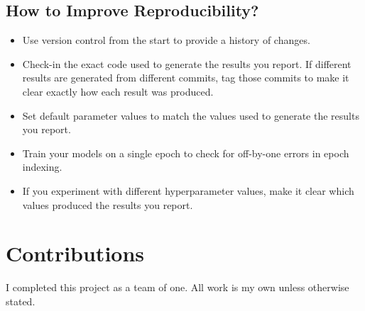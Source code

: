 \documentclass[letterpaper]{article} %
\begin{document}
\subsection{How to Improve Reproducibility?}
\label{sec:improvements}

\begin{itemize}
    \item Use version control from the start to provide a history of changes.
    \item Check-in the exact code used to generate the results you report. If different results are generated from different commits, tag those commits to make it clear exactly how each result was produced.
    \item Set default parameter values to match the values used to generate the results you report.
    \item Train your models on a single epoch to check for off-by-one errors in epoch indexing.
    \item If you experiment with different hyperparameter values, make it clear which values produced the results you report.
\end{itemize}

\section{Contributions}

I completed this project as a team of one. All work is my own unless otherwise stated.


\end{document}
